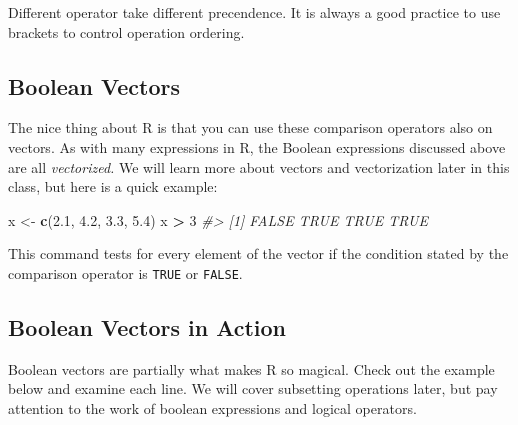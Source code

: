 \documentclass[]{book}
\newenvironment{Shaded}{\begin{snugshade}}{\end{snugshade}}
\newcommand{\KeywordTok}[1]{\textcolor[rgb]{0.13,0.29,0.53}{\textbf{#1}}}
\newcommand{\DecValTok}[1]{\textcolor[rgb]{0.00,0.00,0.81}{#1}}
\newcommand{\FloatTok}[1]{\textcolor[rgb]{0.00,0.00,0.81}{#1}}
\newcommand{\StringTok}[1]{\textcolor[rgb]{0.31,0.60,0.02}{#1}}
\newcommand{\CommentTok}[1]{\textcolor[rgb]{0.56,0.35,0.01}{\textit{#1}}}
\newcommand{\OperatorTok}[1]{\textcolor[rgb]{0.81,0.36,0.00}{\textbf{#1}}}
\newcommand{\NormalTok}[1]{#1}
\begin{document}
Different operator take different precendence. It is always a good
practice to use brackets to control operation ordering.

\subsection{Boolean Vectors}\label{boolean-vectors}

The nice thing about R is that you can use these comparison operators
also on vectors. As with many expressions in R, the Boolean expressions
discussed above are all \emph{vectorized.} We will learn more about
vectors and vectorization later in this class, but here is a quick
example:

\begin{Shaded}
\begin{Highlighting}[]
\NormalTok{x <-}\StringTok{ }\KeywordTok{c}\NormalTok{(}\FloatTok{2.1}\NormalTok{, }\FloatTok{4.2}\NormalTok{, }\FloatTok{3.3}\NormalTok{, }\FloatTok{5.4}\NormalTok{)}
\NormalTok{x }\OperatorTok{>}\StringTok{ }\DecValTok{3}
\CommentTok{#> [1] FALSE  TRUE  TRUE  TRUE}
\end{Highlighting}
\end{Shaded}

This command tests for every element of the vector if the condition
stated by the comparison operator is \texttt{TRUE} or \texttt{FALSE}.

\subsection{Boolean Vectors in Action}\label{boolean-vectors-in-action}

Boolean vectors are partially what makes R so magical. Check out the
example below and examine each line. We will cover subsetting operations
later, but pay attention to the work of boolean expressions and logical
operators.
\end{document}

